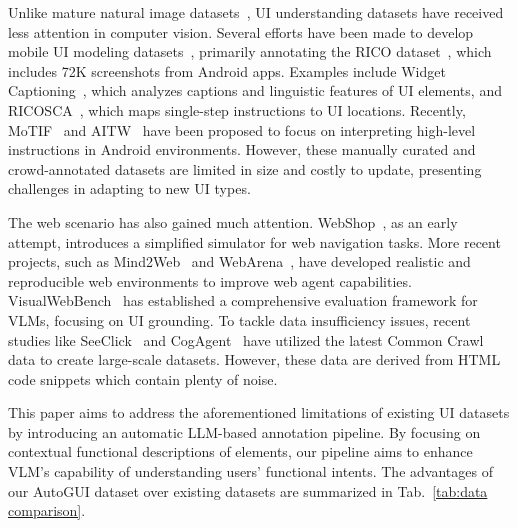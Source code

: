 Unlike mature natural image datasets~\citep{Russakovsky2014ImageNetLS,LAION5B}, UI understanding datasets have received less attention in computer vision. Several efforts have been made to develop mobile UI modeling datasets~\citep{Wang2021Screen2WordsAM,Li2020WidgetCG,Li2020MappingNL,Bai2021UIBertLG,Burns2022ADF}, primarily annotating the RICO dataset~\citep{deka2017rico}, which includes 72K screenshots from Android apps. Examples include Widget Captioning~\citep{Li2020WidgetCG}, which analyzes captions and linguistic features of UI elements, and RICOSCA~\citep{Li2020MappingNL}, which maps single-step instructions to UI locations. Recently, MoTIF~\citep{Burns2022ADF} and AITW~\citep{rawles2023android} have been proposed to focus on interpreting high-level instructions in Android environments. However, these manually curated and crowd-annotated datasets are limited in size and costly to update, presenting challenges in adapting to new UI types.


The web scenario has also gained much attention. WebShop~\citep{yao2022webshop}, as an early attempt, introduces a simplified simulator for web navigation tasks. More recent projects, such as Mind2Web~\citep{deng2024mind2web} and WebArena~\citep{zhou2023webarena}, have developed realistic and reproducible web environments to improve web agent capabilities. VisualWebBench~\citep{liu2024visualwebbench} has established a comprehensive evaluation framework for VLMs, focusing on UI grounding. To tackle data insufficiency issues, recent studies like SeeClick~\citep{cheng2024seeclick} and CogAgent~\citep{hong2023cogagent} have utilized the latest Common Crawl data to create large-scale datasets. However, these data are derived from HTML code snippets which contain plenty of noise.


This paper aims to address the aforementioned limitations of existing UI datasets by introducing an automatic LLM-based annotation pipeline. By focusing on contextual functional descriptions of elements, our pipeline aims to enhance VLM's capability of understanding users' functional intents. The advantages of our AutoGUI dataset over existing datasets are summarized in Tab.~\ref{tab:data comparison}.
